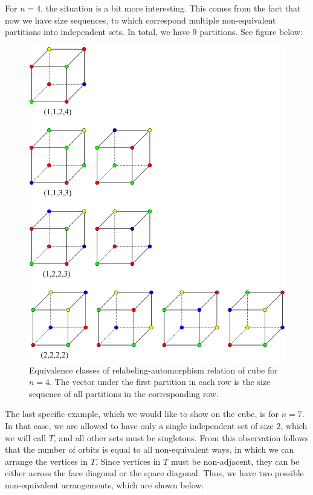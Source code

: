 For $n=4$, the situation is a bit more interesting. This comes from the fact that now we have size sequences, to which correspond multiple non-equivalent partitions into independent sets. In total, we have $9$ partitions. See figure below:

\begin{figure}[H]
    \centering
    \includegraphics[width=1\textwidth]{Resources/Figs/cube_non_relaut-4-clrings.pdf}
    \caption{Equivalence classes of relabeling-automorphism relation of cube for $n=4$. The vector under the first partition in each row is the size sequence of all partitions in the corresponding row.}
    \label{fig:cube-4clring-relaut-classes}
\end{figure}

The last specific example, which we would like to show on the cube, is for $n=7$. In that case, we are allowed to have only a single independent set of size $2$, which we will call $T$, and all other sets must be singletons. From this observation follows that the number of orbits is equal to all non-equivalent ways, in which we can arrange the vertices in $T$. Since vertices in $T$ must be non-adjacent, they can be either across the face diagonal or the space diagonal. Thus, we have two possible non-equivalent arrangements, which are shown below:

